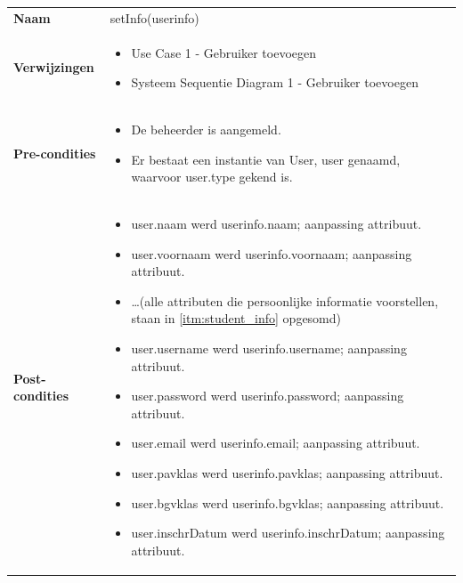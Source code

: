 \documentclass[a4paper]{article}
\begin{document}
\begin{tabularx}{\textwidth}{|l X|}
    \hline
    \textbf{Naam} & setInfo(userinfo) \\
    \textbf{Verwijzingen} & \begin{itemize}[leftmargin=*]
        \item Use Case 1 - Gebruiker toevoegen
        \item Systeem Sequentie Diagram 1 - Gebruiker toevoegen
    \end{itemize}\\
    \textbf{Pre-condities} & \begin{itemize}[leftmargin=*]
        \item De beheerder is aangemeld.
        \item Er bestaat een instantie van User, user genaamd, waarvoor user.type gekend is.
    \end{itemize}\\
    \textbf{Post-condities} & \begin{itemize}[leftmargin=*]
        \item user.naam werd userinfo.naam; aanpassing attribuut.
        \item user.voornaam werd userinfo.voornaam; aanpassing attribuut.
        \item \dots  (alle attributen die persoonlijke informatie voorstellen, staan in \ref{itm:student_info} opgesomd)
        \item user.username werd userinfo.username; aanpassing attribuut.
        \item user.password werd userinfo.password; aanpassing attribuut.
        \item user.email werd userinfo.email; aanpassing attribuut.
        \item user.pavklas werd userinfo.pavklas; aanpassing attribuut.
        \item user.bgvklas werd userinfo.bgvklas; aanpassing attribuut.
        \item user.inschrDatum werd userinfo.inschrDatum; aanpassing attribuut.
    \end{itemize}\\
    \hline
\end{tabularx}\\
\end{document}
